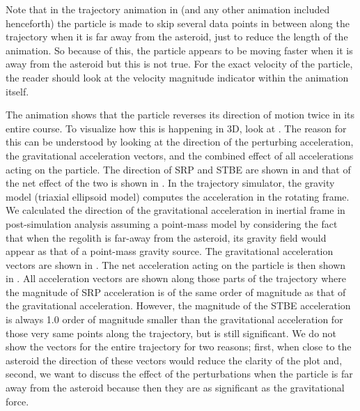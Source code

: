 \FloatBarrier
Note that in the trajectory animation in  (and any other animation included henceforth) the particle is made to skip several data points in between along the trajectory when it is far away from the asteroid, just to reduce the length of the animation. So because of this, the particle appears to be moving faster when it is away from the asteroid but this is not true. For the exact velocity of the particle, the reader should look at the velocity magnitude indicator within the animation itself.

The animation shows that the particle reverses its direction of motion twice in its entire course. To visualize how this is happening in 3D, look at . The reason for this can be understood by looking at the direction of the perturbing acceleration, the gravitational acceleration vectors, and the combined effect of all accelerations acting on the particle. The direction of \gls{SRP} and \gls{STBE} are shown in  and that of the net effect of the two is shown in . In the trajectory simulator, the gravity model (triaxial ellipsoid model) computes the acceleration in the rotating frame. We calculated the direction of the gravitational acceleration in inertial frame in post-simulation analysis assuming a point-mass model by considering the fact that when the regolith is far-away from the asteroid, its gravity field would appear as that of a point-mass gravity source. The gravitational acceleration vectors are shown in . The net acceleration acting on the particle is then shown in . All acceleration vectors are shown along those parts of the trajectory where the magnitude of \gls{SRP} acceleration is of the same order of magnitude as that of the gravitational acceleration. However, the magnitude of the \gls{STBE} acceleration is always 1.0 order of magnitude smaller than the gravitational acceleration for those very same points along the trajectory, but is still significant. We do not show the vectors for the entire trajectory for two reasons; first, when close to the asteroid the direction of these vectors would reduce the clarity of the plot and,  second, we want to discuss the effect of the perturbations when the particle is far away from the asteroid because then they are as significant as the gravitational force.

